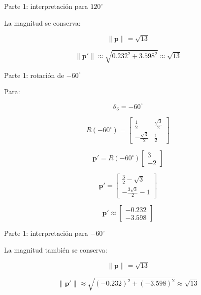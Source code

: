 \documentclass[aspectratio=169]{beamer}
\begin{document}
\begin{frame}{Parte 1: interpretación para \texorpdfstring{$120^\circ$}{120 grados}}

    La magnitud se conserva:

    \[
    \|\mathbf{p}\|=\sqrt{13}
    \]

    \[
    \|\mathbf{p}'\|
    \approx
    \sqrt{0.232^2+3.598^2}
    \approx
    \sqrt{13}
    \]

    \vspace{0.3cm}


\end{frame}

\begin{frame}{Parte 1: rotación de \texorpdfstring{$-60^\circ$}{-60 grados}}

    Para:

    \[
    \theta_3=-60^\circ
    \]

    \[
    R(-60^\circ)
    =
    \begin{bmatrix}
        \frac{1}{2} & \frac{\sqrt{3}}{2}\\
        -\frac{\sqrt{3}}{2} & \frac{1}{2}
    \end{bmatrix}
    \]

    \[
    \mathbf{p}'
    =
    R(-60^\circ)
    \begin{bmatrix}
        3\\
        -2
    \end{bmatrix}
    \]

    \[
    \mathbf{p}'
    =
    \begin{bmatrix}
        \frac{3}{2}-\sqrt{3}\\
        -\frac{3\sqrt{3}}{2}-1
    \end{bmatrix}
    \]

    \[
    \boxed{
        \mathbf{p}'
        \approx
        \begin{bmatrix}
            -0.232\\
            -3.598
    \end{bmatrix}}
    \]

\end{frame}

\begin{frame}{Parte 1: interpretación para \texorpdfstring{$-60^\circ$}{-60 grados}}

    La magnitud también se conserva:

    \[
    \|\mathbf{p}\|=\sqrt{13}
    \]

    \[
    \|\mathbf{p}'\|
    \approx
    \sqrt{(-0.232)^2+(-3.598)^2}
    \approx
    \sqrt{13}
    \]

    \vspace{0.3cm}


\end{frame}
\end{document}
